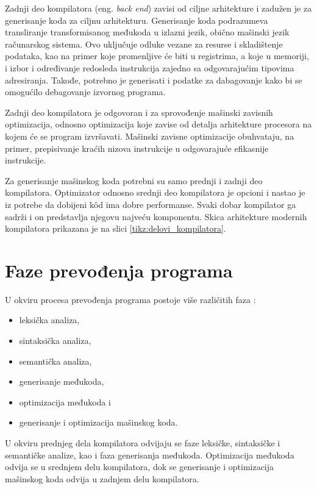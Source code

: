 \documentclass[12pt,oneside]{memoir}
\begin{document}
Zadnji deo kompilatora (eng. \textit{back end}) zavisi od ciljne arhitekture i zadužen 
je za generisanje koda za ciljnu arhitekturu. Generisanje koda podrazumeva 
transliranje transformisanog međukoda u izlazni jezik, obično mašinski jezik 
računarskog sistema. Ovo uključuje odluke vezane za resurse i skladištenje podataka, 
kao na primer koje promenljive će biti u registrima, a koje u memoriji, i izbor i 
određivanje redosleda instrukcija zajedno sa odgovarajućim tipovima adresiranja. 
Takođe, potrebno je generisati i podatke za dabagovanje kako bi se omogućilo 
debagovanje izvornog programa.

Zadnji deo kompilatora je odgovoran i za sprovođenje mašinski zavisnih optimizacija, 
odnosno optimizacija koje zavise od detalja arhitekture procesora na kojem će se 
program izvršavati. Mašinski zavisne optimizacije obuhvataju, na primer, prepisivanje 
kraćih nizova instrukcije u odgovarajuće efikasnije instrukcije.

Za generisanje mašinskog koda potrebni su samo prednji i zadnji deo kompilatora. Optimizator odnosno srednji deo kompilatora je opcioni i nastao je iz potrebe da dobijeni kôd ima dobre performanse. Svaki dobar kompilator ga sadrži i on predstavlja njegovu najveću komponentu. Skica arhitekture modernih kompilatora prikazana je na slici \ref{tikz:delovi_kompilatora}.

\section{Faze prevođenja programa}

U okviru procesa prevođenja programa postoje više različitih faza \cite{dragon_book}: 
\begin{itemize}
 \item leksička analiza, 
\item sintaksička analiza, 
\item semantička analiza,
\item generisanje međukoda,
\item optimizacija međukoda i 
\item generisanje i optimizacija mašinskog koda. 
\end{itemize}

U okviru prednjeg dela kompilatora odvijaju se faze leksičke, sintaksičke i semantičke analize, kao i faza generisanja međukoda. Optimizacija međukoda odvija se u srednjem delu kompilatora, dok se generisanje i optimizacija mašinskog koda odvija u zadnjem delu kompilatora.
\end{document}
